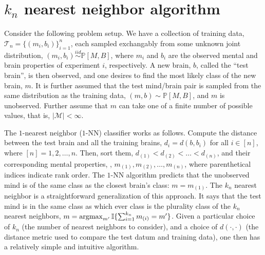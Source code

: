 \documentclass{article}
\newcommand{\PP}{\mathbb{P}}           %
\newcommand{\II}{\mathbb{I}}           %
\providecommand{\mc}[1]{\mathcal{#1}}
\newcommand{\argmax}{\operatornamewithlimits{argmax}}
\begin{document}
\section{$k_n$ nearest neighbor algorithm} %
\label{sec:knn}

Consider the following problem setup.  We have a collection of training data, $\mc{T}_n =\{(m_i,b_i)\}_{i=1}^n$, each sampled exchangably from some unknown joint distribution, $(m_i,b_i)\overset{iid}{\sim} \PP[M,B]$, where $m_i$ and $b_i$ are the observed mental and brain properties of experiment $i$, respectively.  A new brain, $b$, called the ``test brain'', is then observed, and one desires to find the most likely class of the new brain, $m$.  It is further assumed that the test mind/brain pair is sampled from the same distribution as the training data, $(m,b)\sim \PP[M,B]$, and $m$ is unobserved. Further assume that $m$ can take one of a finite number of possible values, that is, $|\mc{M}|<\infty$.

The $1$-nearest neighbor ($1$-NN) classifier works as follows.  Compute the distance between the test brain and all the training brains, $d_i=d(b,b_i)$ for all $i \in [n]$, where $[n]=1,2,\ldots, n$.  Then, sort them, $d_{(1)} < d_{(2)} < \ldots < d_{(n)}$, and their corresponding mental properties, , $m_{(1)}, m_{(2)}, \ldots, m_{(n)}$, where parenthetical indices indicate rank order.  %
The $1$-NN algorithm predicts that the unobserved mind is of the same class as the closest brain's class: $m=m_{(1)}$.  The $k_n$ nearest neighbor is a straightforward generalization of this approach.  It says that the test mind is in the same class as which ever class is the plurality class of the $k_n$ nearest neighbors, $m=\argmax_{m'}\II\{\sum_{i=1}^{k_n} m_{(i)}=m'\}$.  Given a particular choice of $k_n$ (the number of nearest neighbors to consider), and a choice of $d(\cdot,\cdot)$ (the distance metric used to compare the test datum and training data), one then has a relatively simple and intuitive algorithm.  
\end{document}
